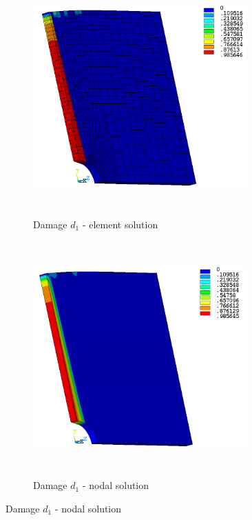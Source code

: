 \documentclass[12pt,a4paper,twoside,openright]{report}
\begin{document}
\begin{figure}[htbp!]
     \captionsetup[subfigure]{justification=centering}
     \begin{subfigure}[htbp!]{0.4\textwidth}
     \begin{center}
         \includegraphics[width=8.2cm,height=9cm]{27.d1-lt-e.png}
         \caption{Damage $d_{1}$ - element solution}
         \label{fig:d1-lt-e}
     \end{center}
     \end{subfigure}
     \hspace{1.9cm}
     \begin{subfigure}[htbp!]{0.4\textwidth}
         \includegraphics[width=8.2cm,height=9cm]{27.d1-lt-n.png}
         \caption{Damage $d_{1}$ - nodal solution}
         \label{fig:d1-lt-n}
     \end{subfigure}
\end{figure}
\end{document}
